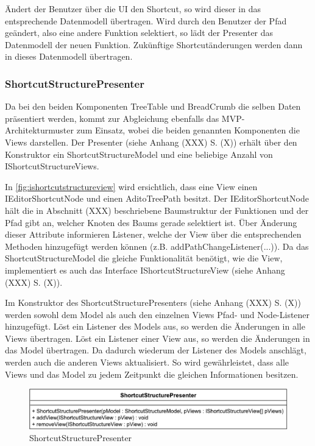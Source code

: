 Ändert der Benutzer über die UI den Shortcut, so wird dieser in das entsprechende Datenmodell übertragen. Wird durch den Benutzer der Pfad geändert, also eine andere Funktion selektiert, so lädt der Presenter das Datenmodell der neuen Funktion. Zukünftige Shortcutänderungen werden dann in dieses Datenmodell übertragen.

\subsubsection{ShortcutStructurePresenter}

Da bei den beiden Komponenten TreeTable und BreadCrumb die selben Daten präsentiert werden, kommt zur Abgleichung ebenfalls das MVP-Architekturmuster zum Einsatz, wobei die beiden genannten Komponenten die Views darstellen. Der Presenter (siehe Anhang (XXX) S. (X)) erhält über den Konstruktor ein ShortcutStructureModel und eine beliebige Anzahl von IShortcutStructureViews. 

In \autoref{fig:ishortcutstructureview} wird ersichtlich, dass eine View einen IEditorShortcutNode und einen AditoTreePath besitzt. Der IEditorShortcutNode hält die in Abschnitt (XXX) beschriebene Baumstruktur der Funktionen und der Pfad gibt an, welcher Knoten des Baums gerade selektiert ist. Über Änderung dieser Attribute informieren Listener, welche der View über die entsprechenden Methoden hinzugefügt werden können (z.B. addPathChangeListener(...)). Da das ShortcutStructureModel die gleiche Funktionalität benötigt, wie die View, implementiert es auch das Interface IShortcutStructureView (siehe Anhang (XXX) S. (X)).

Im Konstruktor des ShortcutStructurePresenters (siehe Anhang (XXX) S. (X)) werden sowohl dem Model als auch den einzelnen Views Pfad- und Node-Listener hinzugefügt. Löst ein Listener des Models aus, so werden die Änderungen in alle Views übertragen. Löst ein Listener einer View aus, so werden die Änderungen in das Model übertragen. Da dadurch wiederum der Listener des Models anschlägt, werden auch die anderen Views aktualisiert. So wird gewährleistet, dass alle Views und das Model zu jedem Zeitpunkt die gleichen Informationen besitzen.

\begin{figure}[H]
	\centering
	\includegraphics[width=0.6\linewidth]{../graphic/diagrams/CD_ShortcutStructurePresenter/ShortcutStructurePresenter}
	\caption{ShortcutStructurePresenter}
	\label{fig:shortcutstructurepresenter}
\end{figure}

\newpage